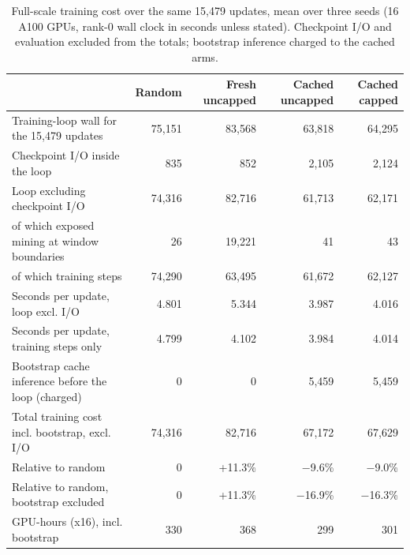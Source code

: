 \begin{table}[t]
  \caption{Full-scale training cost over the same 15{,}479 updates, mean over three seeds (16 A100 GPUs, rank-0 wall clock in seconds unless stated). Checkpoint I/O and evaluation excluded from the totals; bootstrap inference charged to the cached arms.}
  \label{tab:app-cost}
  \footnotesize\setlength{\tabcolsep}{4pt}
  \begin{tabular}{lrrrr}
    \toprule
     & Random & Fresh uncapped & Cached uncapped & Cached capped \\
    \midrule
Training-loop wall for the 15,479 updates & 75,151 & 83,568 & 63,818 & 64,295 \\
Checkpoint I/O inside the loop & 835 & 852 & 2,105 & 2,124 \\
Loop excluding checkpoint I/O & 74,316 & 82,716 & 61,713 & 62,171 \\
of which exposed mining at window boundaries & 26 & 19,221 & 41 & 43 \\
of which training steps & 74,290 & 63,495 & 61,672 & 62,127 \\
Seconds per update, loop excl. I/O & 4.801 & 5.344 & 3.987 & 4.016 \\
Seconds per update, training steps only & 4.799 & 4.102 & 3.984 & 4.014 \\
Bootstrap cache inference before the loop (charged) & 0 & 0 & 5,459 & 5,459 \\
Total training cost incl. bootstrap, excl. I/O & 74,316 & 82,716 & 67,172 & 67,629 \\
Relative to random & 0 & +11.3\% & $-$9.6\% & $-$9.0\% \\
Relative to random, bootstrap excluded & 0 & +11.3\% & $-$16.9\% & $-$16.3\% \\
GPU-hours (x16), incl. bootstrap & 330 & 368 & 299 & 301 \\
    \bottomrule
  \end{tabular}
\end{table}
